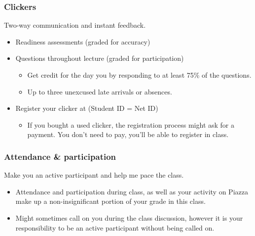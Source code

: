 \documentclass[11pt,containsverbatim,handout,xcolor=xelatex,dvipsnames,table]{beamer}
\begin{document}
\begin{frame}
\frametitle{Clickers}

 Two-way communication and instant feedback.

\begin{itemize}
\item Readiness assessments (graded for accuracy)

\item Questions throughout lecture (graded for participation)
\begin{itemize}
\item Get credit for the day you by responding to at least 75\% of the questions.
\item Up to three unexcused late arrivals or absences.
\end{itemize}

\item Register your clicker at  
(Student ID = Net ID)
\begin{itemize}
\item If you bought a used clicker, the registration process might ask for a payment. 
You don't need to pay, you'll be able to register in class.
\end{itemize}

\end{itemize}


\end{frame}


\begin{frame}
\frametitle{Attendance \& participation}

 Make you an active participant and help me pace the class.

\begin{itemize}

\item Attendance and participation during class, as well as your activity on Piazza 
make up a non-insignificant portion of your grade in this class.

\item Might sometimes call on you during the class discussion, however it is your 
responsibility to be an active participant without being called on.

\end{itemize}

\end{frame}
\end{document}
